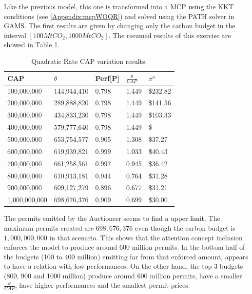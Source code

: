 \documentclass[a4paper,fleqn]{cas-dc}
\begin{document}
Like the previous model, this one is transformed into a MCP using the KKT conditions (see \ref{Appendix:mcpWOQR}) and solved using the PATH solver in GAMS. The first results are given by changing only the carbon budget in the interval $[100MtCO_2 , 1000MtCO_2]$. The resumed results of this exercise are showed in Table \ref{resultadostasacuadrada}.

\begin{table}[H]
    \centering
    \caption{{\footnotesize Quadratic Rate CAP variation results.}}
    \label{resultadostasacuadrada}
    \begin{tabular}{ l l l l l}
    \hline
        CAP & $\theta$ & Perf[P] & $\frac{\theta}{CAP}$  & $\pi^a$  \\ \hline
        100,000,000 & 144,944,410  & 0.798  & 1.449  &  \$232.82   \\ \hline
        200,000,000 & 289,888,820  & 0.798  & 1.449  &  \$141.56   \\ \hline
        300,000,000 & 434,833,230  & 0.798  & 1.449  &  \$103.33   \\ \hline
        400,000,000 & 579,777,640  & 0.798  & 1.449  &  \$-   \\ \hline
        500,000,000 & 653,754,577  & 0.905  & 1.308  &  \$37.27   \\ \hline
        600,000,000 & 619,939,821  & 0.999  & 1.033  &  \$40.43   \\ \hline
        700,000,000 & 661,258,561  & 0.997  & 0.945  &  \$36.42   \\ \hline
        800,000,000 & 610,913,181  & 0.944  & 0.764  &  \$31.28   \\ \hline
        900,000,000 & 609,127,279  & 0.896  & 0.677  &  \$31.21   \\ \hline
        1,000,000,000 & 698,676,376  & 0.909  & 0.699  &  \$30.00   \\ \hline
    \end{tabular}
\end{table}

The permits emitted by the Auctioneer seems to find a upper limit. The maximum permits created are $698,676,376$ even though the carbon budget is $1,000,000,000$ in that scenario. This shows that the attention concept inclusion enforces the model to produce around 600 million permits. In the bottom half of the budgets (100 to 400 million) emitting far from that enforced amount, appears to have a relation with low performances. On the other hand, the top 3 budgets (800, 900 and 1000 million) produce around 600 million permits, have a smaller $\frac{\theta}{CAP}$, have higher performances and the smallest permit prices. 
\end{document}
